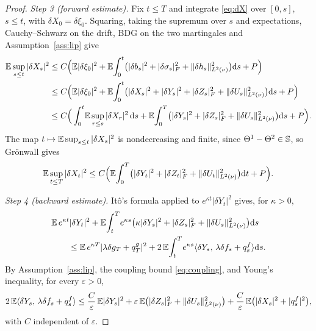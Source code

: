 \begin{proof}
\emph{Step 3 (forward estimate).} Fix $t\le T$ and integrate \eqref{eq:dX} over $[0,s]$,
$s\le t$, with $\delta X_0=\delta\xi_0$. Squaring, taking the supremum over $s$ and
expectations, Cauchy--Schwarz on the drift, BDG on the two martingales and
Assumption~\ref{ass:lip} give
\[
\begin{aligned}
\mathbb{E}\sup_{s\le t}|\delta X_s|^2
&\le C\Big(\mathbb{E}|\delta\xi_0|^2+\mathbb{E}\!\int_0^t\!\big(|\delta b_s|^2+|\delta\sigma_s|_F^2+\lVert \delta h_s\rVert_{L^2(\nu)}^2\big)\mathrm{d} s+P\Big)\\
&\le C\Big(\mathbb{E}|\delta\xi_0|^2+\mathbb{E}\!\int_0^t\!\big(|\delta X_s|^2+|\delta Y_s|^2+|\delta Z_s|_F^2+\lVert \delta U_s\rVert_{L^2(\nu)}^2\big)\mathrm{d} s+P\Big)\\
&\le C\Big(\int_0^t\!\mathbb{E}\sup_{r\le s}|\delta X_r|^2\,\mathrm{d} s
+\mathbb{E}\!\int_0^T\!\big(|\delta Y_s|^2+|\delta Z_s|_F^2+\lVert \delta U_s\rVert_{L^2(\nu)}^2\big)\mathrm{d} s+P\Big) .
\end{aligned}
\]
The map $t\mapsto\mathbb{E}\sup_{s\le t}|\delta X_s|^2$ is nondecreasing and finite, since
$\Theta^1-\Theta^2\in\mathbb{S}$, so Gr\"onwall gives
\begin{equation}\label{eq:fwd}
\mathbb{E}\sup_{t\le T}|\delta X_t|^2\le C\Big(\mathbb{E}\!\int_0^T\!\big(|\delta Y_t|^2+|\delta Z_t|_F^2+\lVert \delta U_t\rVert_{L^2(\nu)}^2\big)\mathrm{d} t+P\Big).
\end{equation}

\emph{Step 4 (backward estimate).} It\^o's formula applied to $e^{\kappa t}|\delta Y_t|^2$
gives, for $\kappa>0$,
\begin{equation}\label{eq:bwdito}
\begin{aligned}
&\mathbb{E}\,e^{\kappa t}|\delta Y_t|^2
+\mathbb{E}\!\int_t^T\!e^{\kappa s}\big(\kappa|\delta Y_s|^2+|\delta Z_s|_F^2+\lVert \delta U_s\rVert_{L^2(\nu)}^2\big)\mathrm{d} s\\
&\qquad\le\mathbb{E}\,e^{\kappa T}|\lambda\delta g_T+q^g_T|^2
+2\,\mathbb{E}\!\int_t^T\!e^{\kappa s}\langle \delta Y_s,\,\lambda\delta f_s+q^f_s\rangle\mathrm{d} s .
\end{aligned}
\end{equation}
By Assumption~\ref{ass:lip}, the coupling bound \eqref{eq:coupling}, and Young's
inequality, for every $\varepsilon>0$,
\begin{equation}\label{eq:bwdyoung}
2\,\mathbb{E}\langle \delta Y_s,\,\lambda\delta f_s+q^f_s\rangle
\le \frac C\varepsilon\,\mathbb{E}|\delta Y_s|^2+\varepsilon\,\mathbb{E}\big(|\delta Z_s|_F^2+\lVert \delta U_s\rVert_{L^2(\nu)}^2\big)
+\frac C\varepsilon\,\mathbb{E}\big(|\delta X_s|^2+|q^f_s|^2\big),
\end{equation}
with $C$ independent of $\varepsilon$.


\end{proof}
